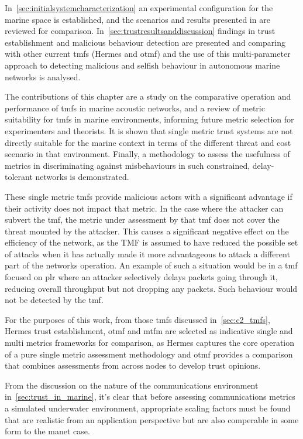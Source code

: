 In~\autoref{sec:initialsystemcharacterization} an experimental configuration for the marine space is established, and the scenarios and results presented in \cite{Guo11} are reviewed for comparison.
In~\autoref{sec:trustresultsanddiscussion} findings in trust establishment and malicious behaviour detection are presented and comparing with other current \glspl{tmf} (Hermes and \gls{otmf}) and the use of this multi-parameter approach to detecting malicious and selfish behaviour in autonomous marine networks is analysed.

The contributions of this chapter are a study on the comparative operation and performance of \glspl{tmf} in marine acoustic networks, and a review of metric suitability for \glspl{tmf} in marine environments, informing future metric selection for experimenters and theorists.
It is shown that single metric trust systems are not directly suitable for the marine context in terms of the different threat and cost scenario in that environment.
Finally, a methodology to assess the usefulness of metrics in discriminating against misbehaviours in such constrained, delay-tolerant networks is demonstrated.


These single metric \glspl{tmf} provide malicious actors with a significant advantage if their activity does not impact that metric.
In the case where the attacker can subvert the \gls{tmf}, the metric under assessment by that \gls{tmf} does not cover the threat mounted by the attacker.
This causes a significant negative effect on the efficiency of the network, as the TMF is assumed to have reduced the possible set of attacks when it has actually made it more advantageous to attack a different part of the networks operation.
An example of such a situation would be in a \gls{tmf} focused on \gls{plr} where an attacker selectively delays packets going through it, reducing overall throughput but not dropping any packets.
Such behaviour would not be detected by the \gls{tmf}.

For the purposes of this work, from those \glspl{tmf} discussed in~\autoref{sec:c2_tmfs}, Hermes trust establishment, \gls{otmf} and \gls{mtfm} are selected as indicative single and multi metrics frameworks for comparison, as Hermes captures the core operation of a pure single metric assessment methodology and \gls{otmf} provides a comparison that combines assessments from across nodes to develop trust opinions.

From the discussion on the nature of the communications environment in~\autoref{sec:trust_in_marine}, it's clear that before assessing communications metrics a simulated underwater environment, appropriate scaling factors must be found that are realistic from an application perspective but are also comperable in some form to the \gls{manet} case.

